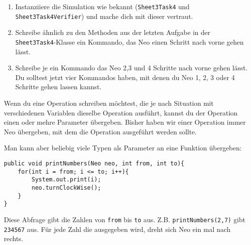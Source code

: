 
\begin{enumerate}
	\item
	Instanziiere die Simulation wie bekannt (\lstinline{Sheet3Task4} und \lstinline{Sheet3Task4Verifier}) und mache dich mit dieser vertraut.
\item
Schreibe ähnlich zu den Methoden aus der letzten Aufgabe in der \lstinline{Sheet3Task4}-Klasse ein Kommando, das Neo einen Schritt nach vorne gehen lässt.
\item
Schreibe je ein Kommando das Neo 2,3 und 4 Schritte nach vorne gehen lässt.
Du solltest jetzt vier Kommandos haben, mit denen du Neo 1, 2, 3 oder 4 Schritte gehen lassen kannst.
\end{enumerate}

\begin{Infobox}[Operationsparameter]
Wenn du eine Operation schreiben möchtest, die je nach Situation mit verschiedenen Variablen dieselbe Operation ausführt, kannst du der Operation einen oder mehre Parameter übergeben.
Bisher haben wir einer Operation immer Neo übergeben, mit dem die Operation ausgeführt werden sollte.\newline

Man kann aber beliebig viele Typen als Parameter an eine Funktion übergeben:

	\begin{lstlisting}[xleftmargin=0.5cm]
public void printNumbers(Neo neo, int from, int to){
    for(int i = from; i <= to; i++){
		System.out.print(i);
		neo.turnClockWise();
    }
}
	\end{lstlisting}

	Diese Abfrage gibt die Zahlen von \lstinline{from} bis \lstinline{to} aus.
	Z.B. \lstinline{printNumbers(2,7)} gibt \lstinline{234567} aus.
	Für jede Zahl die ausgegeben wird, dreht sich Neo ein mal nach rechts.
\end {Infobox}


